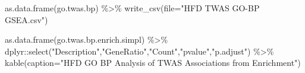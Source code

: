 \documentclass[
]{article}
\newenvironment{Shaded}{\begin{snugshade}}{\end{snugshade}}
\newcommand{\AttributeTok}[1]{\textcolor[rgb]{0.77,0.63,0.00}{#1}}
\newcommand{\FunctionTok}[1]{\textcolor[rgb]{0.00,0.00,0.00}{#1}}
\newcommand{\NormalTok}[1]{#1}
\newcommand{\SpecialCharTok}[1]{\textcolor[rgb]{0.00,0.00,0.00}{#1}}
\newcommand{\StringTok}[1]{\textcolor[rgb]{0.31,0.60,0.02}{#1}}
\begin{document}
\begin{Shaded}
\begin{Highlighting}[]
\FunctionTok{as.data.frame}\NormalTok{(go.twas.bp) }\SpecialCharTok{\%\textgreater{}\%}
  \FunctionTok{write\_csv}\NormalTok{(}\AttributeTok{file=}\StringTok{"HFD TWAS GO{-}BP GSEA.csv"}\NormalTok{)}

\FunctionTok{as.data.frame}\NormalTok{(go.twas.bp.enrich.simpl) }\SpecialCharTok{\%\textgreater{}\%}\NormalTok{ dplyr}\SpecialCharTok{::}\FunctionTok{select}\NormalTok{(}\StringTok{"Description"}\NormalTok{,}\StringTok{"GeneRatio"}\NormalTok{,}\StringTok{"Count"}\NormalTok{,}\StringTok{"pvalue"}\NormalTok{,}\StringTok{"p.adjust"}\NormalTok{) }\SpecialCharTok{\%\textgreater{}\%} 
  \FunctionTok{kable}\NormalTok{(}\AttributeTok{caption=}\StringTok{"HFD GO BP Analysis of TWAS Associations from Enrichment"}\NormalTok{)}
\end{Highlighting}
\end{Shaded}
\end{document}
